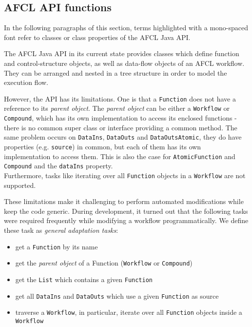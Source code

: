 \begin{appendix}


\chapter{AFCL API functions}
\label{apx:afcl-functions}

In the following paragraphs of this section, terms highlighted with a mono-spaced font refer to classes or class properties of the AFCL Java API.

The AFCL Java API in its current state provides classes which define function and control-structure objects, as well as data-flow objects of an AFCL workflow. They can be arranged and nested in a tree structure in order to model the execution flow.

However, the API has its limitations. One is that a \texttt{Function} does not have a reference to its \textit{parent object}. The \textit{parent object} can be either a \texttt{Workflow} or \texttt{Compound}, which has its own implementation to access its enclosed functions - there is no common super class or interface providing a common method. The same problem occurs on \texttt{DataIns}, \texttt{DataOuts} and \texttt{DataOutsAtomic}, they do have properties (e.g. \texttt{source}) in common, but each of them has its own implementation to access them. This is also the case for \texttt{AtomicFunction} and \texttt{Compound} and the \texttt{dataIns} property.\\
Furthermore, tasks like iterating over all \texttt{Function} objects in a \texttt{Workflow} are not supported. 

These limitations make it challenging to perform automated modifications while keep the code generic.
During development, it turned out that the following tasks were required frequently while modifying a workflow programmatically. We define these task  as \textit{general adaptation tasks}:
\begin{itemize}
	\item get a \texttt{Function} by its name
	\item get the \textit{parent object} of a Function (\texttt{Workflow} or \texttt{Compound})
	\item get the \texttt{List} which contains a given \texttt{Function}
	\item get all \texttt{DataIns} and \texttt{DataOuts} which use a given \texttt{Function} as source
	\item traverse a \texttt{Workflow}, in particular, iterate over all \texttt{Function} objects inside a \texttt{Workflow}
\end{itemize}


\end{appendix}
